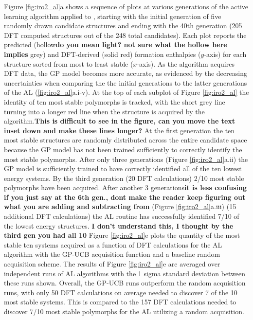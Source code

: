 %
Figure \ref{fig:iro2_al}a shows a sequence of plots at various generations of the active learning algorithm applied to \IrOthree,
starting with the initial generation of five randomly drawn candidate structures and ending with the 40th generation
(\num{205} DFT computed structures out of the \num{248} total candidates).
%
Each plot reports the predicted (hollow\textbf{do you mean light? not sure what the hollow here implies} grey) and DFT-derived (solid red) formation enthalpies ($y$-axis) for each structure sorted from most to least stable ($x$-axis).
%
As the algorithm acquires DFT data, the GP model becomes more accurate, as evidenced by the decreasing uncertainties when comparing the the initial generations to the latter generations of the AL (\ref{fig:iro2_al}a.i-v).
%
At the top of each subplot of Figure \ref{fig:iro2_al} the identity of ten most stable polymorphs is tracked,
with the short grey line turning into a longer red line when the structure is acquired by the algorithm.\textbf{This is difficult to see in the figure, can you move the text inset down and make these lines longer?}
%
At the first generation the ten most stable structures are randomly distributed across the entire candidate space because the GP model has not been trained sufficiently to correctly identify the most stable polymorphs.
%
After only three generations (Figure \ref{fig:iro2_al}a.ii) the GP model is sufficiently trained to have correctly identified all of the ten lowest energy systems.
%
By the third generation (\num{20} DFT calculations) \num{2/10} most stable polymorphs have been acquired.
%
After another \num{3} generations\textbf{it is less confusing if you just say at the 6th gen., dont make the reader keep figuring out what you are adding and subtracting from} (Figure \ref{fig:iro2_al}a.iii) (\num{15} additional DFT calculations) the AL routine has successfully identified \num{7/10} of the lowest energy structures. \textbf{I don't understand this, I thought by the third gen you had all 10}
%
Figure \ref{fig:iro2_al}e plots the quantity of the most stable ten systems acquired as a function of DFT calculations for the AL algorithm with the GP-UCB acquisition function and a baseline random acquisition scheme.
%
The results of Figure \ref{fig:iro2_al}e are averaged over independent runs of AL algorithms with the 1 sigma standard deviation between these runs shown.
%
Overall, the GP-UCB runs outperform the random acquisition runs, with only \num{50} DFT calculations on average needed to discover \num{7} of the \num{10} most stable systems.
%
This is compared to the \num{157} DFT calculations needed to discover \num{7/10} most stable polymorphs for the AL utilizing a random acquisition.


